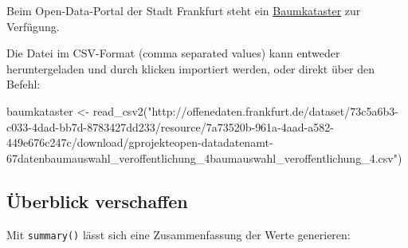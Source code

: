 \documentclass[
  ngerman,
]{article}
\newenvironment{Shaded}{\begin{snugshade}}{\end{snugshade}}
\newcommand{\FunctionTok}[1]{\textcolor[rgb]{0.00,0.00,0.00}{#1}}
\newcommand{\NormalTok}[1]{#1}
\newcommand{\OtherTok}[1]{\textcolor[rgb]{0.56,0.35,0.01}{#1}}
\newcommand{\StringTok}[1]{\textcolor[rgb]{0.31,0.60,0.02}{#1}}
\begin{document}
Beim Open-Data-Portal der Stadt Frankfurt steht ein \href{http://offenedaten.frankfurt.de/dataset/baumkataster-frankfurt-am-main}{Baumkataster} zur Verfügung.

Die Datei im CSV-Format (comma separated values) kann entweder heruntergeladen und durch klicken importiert werden, oder direkt über den Befehl:

\begin{Shaded}
\begin{Highlighting}[]
\NormalTok{baumkataster }\OtherTok{\textless{}{-}} \FunctionTok{read\_csv2}\NormalTok{(}\StringTok{"http://offenedaten.frankfurt.de/dataset/73c5a6b3{-}c033{-}4dad{-}bb7d{-}8783427dd233/resource/7a73520b{-}961a{-}4aad{-}a582{-}449e676c247c/download/gprojekteopen{-}datadatenamt{-}67datenbaumauswahl\_veroffentlichung\_4baumauswahl\_veroffentlichung\_4.csv"}\NormalTok{)}
\end{Highlighting}
\end{Shaded}

\hypertarget{uxfcberblick-verschaffen}{%
\subsection{Überblick verschaffen}\label{uxfcberblick-verschaffen}}

Mit \texttt{summary()} lässt sich eine Zusammenfassung der Werte generieren:
\end{document}
